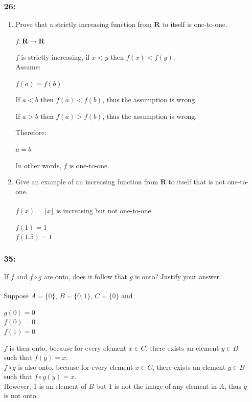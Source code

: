 \documentclass[12pt,en,a4paper]{article}
\begin{document}
	\subsubsection*{26:}
	\begin{enumerate}[label=\textbf{\alph*)}]
		\item Prove that a strictly increasing function from $\mathbf{R}$ to itself is one-to-one.
		\begin{center}
			$f:\mathbf{R}\rightarrow\mathbf{R}$
		\end{center}
		$f$ is strictly increasing, if $x<y$ then $f(x)<f(y)$.\\
		Assume:
		\begin{center}
			$f(a)=f(b)$
		\end{center}
		If $a<b$ then $f(a)<f(b)$, thus the assumption is wrong.
		
		If $a>b$ then $f(a)>f(b)$, thus the assumption is wrong.
		
		Therefore:
		\begin{center}
			$a=b$
		\end{center}
		In other words, $f$ is one-to-one.
		\item Give an example of an increasing function from $\mathbf{R}$ to itself that is not one-to-one.\\\\
		$f(x)=\lfloor x\rfloor$ is increasing but not one-to-one.
		\begin{center}
			$f(1)=1$\\
			$f(1.5)=1$
		\end{center}
	\end{enumerate}
	\subsubsection*{35:}
	If $f$ and $f \circ g$ are onto, does it follow that $g$ is onto? Justify your answer.\\\\
	Suppose $A=\{0\}$, $B=\{0,1\}$, $C=\{0\}$ and
	\begin{center}
		$g(0)=0$\\
		$f(0)=0$\\
		$f(1)=0$
	\end{center}
	$f$ is then onto, because for every element $x\in C$, there exists an element $y\in B$ such that $f(y)=x$.\\
	$f\circ g$ is also onto, because for every element $x\in C$, there exists an element $y\in B$ such that $f\circ g(y)=x$.\\
	However, $1$ is an element of $B$ but $1$ is not the image of any element in $A$, thus $g$ is not onto.
\end{document}
